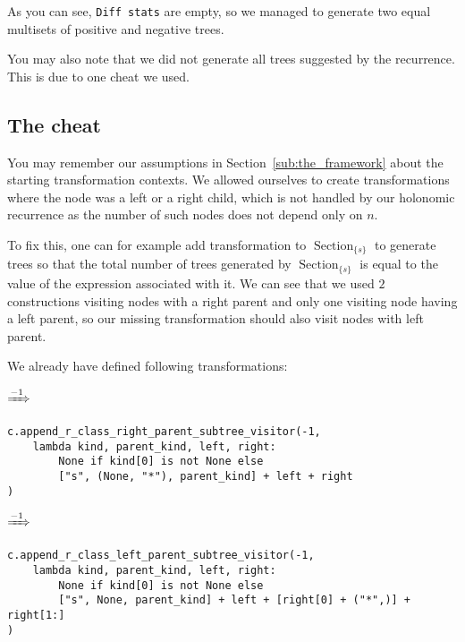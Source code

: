 \documentclass[final]{article}
\theoremstyle{definition}
\theoremstyle{definition}
\theoremstyle{remark}
\DeclareMathOperator{\tSection}{\text{Section}}
\newcommand{\includeinlinescaledsvg}[3]{\begin{minipage}{#1\textwidth}\begin{center}\end{center}\end{minipage}}
\begin{document}
As you can see, \verb|Diff stats| are empty, so we managed to generate two equal multisets of positive and negative trees.

You may also note that we did not generate all trees suggested by the recurrence. This is due to one cheat we used.

\subsection{The cheat}%
\label{sub:the_cheat}

You may remember our assumptions in Section~\ref{sub:the_framework} about the starting transformation contexts. We allowed ourselves to create transformations where the node was a left or a right child, which is not handled by our holonomic recurrence as the number of such nodes does not depend only on \(n\).

To fix this, one can for example add transformation to \(\tSection_{\{s\}}\) to generate trees so that the total number of trees generated by \(\tSection_{\{s\}}\) is equal to the value of the expression associated with it. We can see that we used \(2\) constructions visiting nodes with a right parent and only one visiting node having a left parent, so our missing transformation should also visit nodes with left parent.

We already have defined following transformations:

\begin{center}
    \includeinlinescaledsvg{.4}{.7}{lambda__transformations__003a}%
    \(\xRightarrow{-1}\)%
    \includeinlinescaledsvg{.4}{.7}{lambda__transformations__003b}%
\end{center}

\begin{lstlisting}
c.append_r_class_right_parent_subtree_visitor(-1,
    lambda kind, parent_kind, left, right:
        None if kind[0] is not None else
        ["s", (None, "*"), parent_kind] + left + right
)
\end{lstlisting}

\begin{center}
    \includeinlinescaledsvg{.4}{.7}{lambda__transformations__012a}%
    \(\xRightarrow{-1}\)%
    \includeinlinescaledsvg{.4}{.7}{lambda__transformations__012b}%
\end{center}

\begin{lstlisting}
c.append_r_class_left_parent_subtree_visitor(-1,
    lambda kind, parent_kind, left, right:
        None if kind[0] is not None else
        ["s", None, parent_kind] + left + [right[0] + ("*",)] + right[1:]
)
\end{lstlisting}
\end{document}
